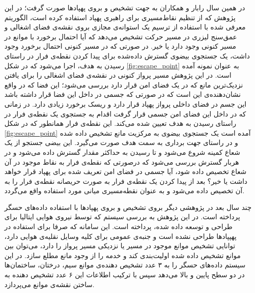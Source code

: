 
در همین سال رابار و همکاران به جهت تشخیص و  بروی پهپادها صورت گرفت؛ در این پژوهش که از تنظیم نقاط‌مسیری برای راهبری پهپاد استفاده کرده است، الگوریتم معرفی شده با استفاده از ترسیم یک استوانه‌ی مجازی بروی نقشه‌ی فضای اشغالی و عمق‌سنج لیزری در مسیر حرکت تشخیص می‌دهد که آیا احتمال برخورد با موانع در مسیر کنونی وجود دارد یا خیر. در صورتی که در مسیر کنونی احتمال برخورد وجود داشت، یک جستجوی بیضوی گسترش داده‌شده برای پیدا کردن نقطه‌ی فرار در راستای رسیدن به هدف، اجرا می‌شود که در شکل \ref{fig:escape_point} به عنوان نمونه آمده است. در این پژوهش مسیر پرواز کنونی در نقشه‌ی فضای اشغالی را برای یافتن نزدیک‌ترین مانع که در یک فضای امن قرار دارد بررسی می‌شود؛ این فضا که در واقع نشان‌دهنده‌ی این است که در صورتی که جسمی در داخل این فضا قرار داشته باشد این جسم در فضای داخلی پرواز پهپاد قرار دارد و ریسک برخورد زیادی دارد. در زمانی که در داخل این فضای امن جسمی قرار گرفت اقدام به جستجوی یک نقطه‌ی فرار در راستای رسیدن به هدف تعیین شده می‌کند. این نقطه‌ی فرار همانطور که در شکل \ref{fig:escape_point} آمده است یک جستجوی بیضوی به مرکزیت مانع تشخیص داده شده و در راستای جهت برداری به سمت هدف صورت می‌گیرد. این بیضی جستجو از یک شعاع کمینه شروع می‌شود و تا رسیدن به حداکثر مقدار گسترش داده می‌شود و در هربار گسترش بررسی می‌شود که درصورتی که نقطه‌ی فرار به نقاط موجود در آن شعاع تخصیص داده شود، آیا جسمی در فضای امن تعریف شده برای پهپاد قرار خواهد داشت یا خیر؟ بعد از پیدا کردن یک نقطه‌ی فرار به صورت حریصانه نقطه‌ی فرار را به آن تخصیص داده می‌شود و به عنوان نقطه‌‌مسیری میانی مورد استفاده واقع می‌گردد.


چند سال بعد در  پژوهشی دیگر بروی تشخیص و  بروی پهپادها با استفاده داده‌های حسگر  پرداخته است. در این پژوهش به بررسی سیستم  که توسط نیروی هوایی ایتالیا برای  طراحی و توسعه داده شده، پرداخته است. این سامانه که صرفا برای استفاده در پهپپادها طراحی نشده است و جنبه‌ی عمومی برای کلیه وسایل نقلیه‌ی هوایی دارد، توانایی تشخیص موانع موجود در مسیر یا نزدیکی مسیر پرواز را دارد، می‌توان بین موانع تشخیص داده شده اولیت‌بندی کند و خدمه را از وجود مانع مطلع سازد. در این سیستم داده‌های حسگر را به ۳ عدد تشخیص دهنده‌ی موانع  سیم، درختان، ساختمان‌ها در دو سطح پایین و بالا می‌دهد سپس با ترکیب اطلاعات این ۶ عدد تشخیص دهنده به ساختن نقشه‌ی موانع می‌پردازد.

